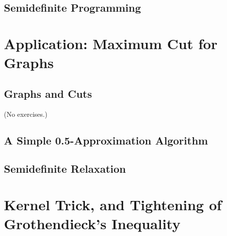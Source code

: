 \documentclass{report}
\theoremstyle{definition}
\newenvironment{exercise}[1]{
  \renewcommand\theexerciseimpl{#1}
  \exerciseimpl
}{\endexerciseimpl}
\begin{document}
\begin{exercise}{3.5.2}
\end{exercise}

\begin{exercise}{3.5.3}
\end{exercise}

\subsection{Semidefinite Programming}

\begin{exercise}{3.5.5}
\end{exercise}

\begin{exercise}{3.5.7}
\end{exercise}

\section{Application: Maximum Cut for Graphs}

\subsection{Graphs and Cuts}

(No exercises.)

\subsection{A Simple 0.5-Approximation Algorithm}

\begin{exercise}{3.6.4}
\end{exercise}

\subsection{Semidefinite Relaxation}

\begin{exercise}{3.6.6}
\end{exercise}

\begin{exercise}{3.6.7}
\end{exercise}

\section{Kernel Trick, and Tightening of Grothendieck's Inequality}
\end{document}
